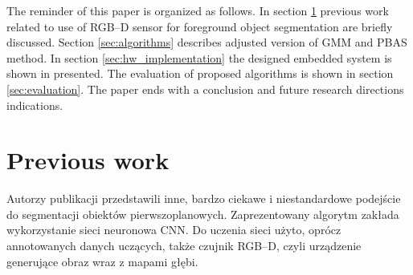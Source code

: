 \documentclass[b5paper,10pt,twoside]{article}
\begin{document}
{%

The reminder of this paper is organized as follows. In section \ref{sec:prev_work} previous work related to use of RGB--D sensor for foreground object segmentation are briefly discussed. Section \ref{sec:algorithms} describes adjusted version of GMM and PBAS method. In section \ref{sec:hw_implementation} the designed embedded system is shown in presented. The evaluation of proposed algorithms is shown in section \ref{sec:evaluation}. The paper ends with a conclusion and future research directions indications.


\section{Previous work}
\label{sec:prev_work}


Autorzy publikacji \cite{Hoffman_2016} przedstawili inne, bardzo ciekawe i niestandardowe podejście do segmentacji obiektów pierwszoplanowych. 
Zaprezentowany algorytm zakłada wykorzystanie sieci neuronowa CNN. 
Do uczenia sieci użyto, oprócz annotowanych danych uczących, także czujnik RGB--D, czyli urządzenie generujące obraz wraz z mapami głębi. 

}
\end{document}
